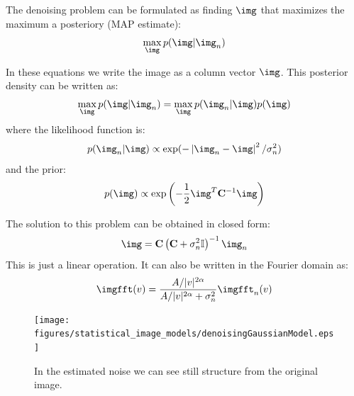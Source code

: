 The denoising problem can be formulated as finding $\img$ that maximizes the maximum a posteriory (MAP estimate):
\begin{equation}
\max_\img p(\img | \img_n) 
\end{equation}

In these equations we write the image as a column vector $\img$. This posterior density can be written as:
\begin{equation}
\max_\img p(\img | \img_n) = \max_\img p(\img_n | \img) p(\img)
\end{equation}
where the likelihood function is:
\begin{equation}
p(\img_n | \img) \propto \exp( - \left| \img_n - \img \right| ^2 / \sigma_n^2)
\end{equation}
and the prior:
\begin{equation}
p(\img) \propto \exp \left(-\frac{1}{2} \img^T {\bf C}^{-1} \img \right)
\end{equation}

The solution to this problem can be obtained in closed form:
\begin{equation}
\img = {\bf C} \left( {\bf C} + \sigma_n^2   \mathbb{I} \right)^{-1} \img_n
\end{equation}
This is just a linear operation. It can also be written in the Fourier domain as:
\begin{equation}
\imgfft(v) = \frac{A/|v|^{2\alpha}}{A/|v|^{2\alpha} + \sigma_n^2} \imgfft_n(v) 
\end{equation}


\begin{figure}[htpb]
\centerline{
\texttt{[image: figures/statistical\_image\_models/denoisingGaussianModel.eps]}
} 
\caption{In the estimated noise we can see still structure from the original image.} 
\label{fig:denoisingGaussianModel}
\end{figure}











